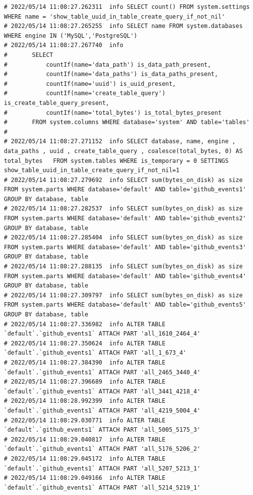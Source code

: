 \begin{verbatim}
# 2022/05/14 11:08:27.262311  info SELECT count() FROM system.settings WHERE name = 'show_table_uuid_in_table_create_query_if_not_nil'
# 2022/05/14 11:08:27.265255  info SELECT name FROM system.databases WHERE engine IN ('MySQL','PostgreSQL')
# 2022/05/14 11:08:27.267740  info
# 		SELECT
# 			countIf(name='data_path') is_data_path_present,
# 			countIf(name='data_paths') is_data_paths_present,
# 			countIf(name='uuid') is_uuid_present,
# 			countIf(name='create_table_query') is_create_table_query_present,
# 			countIf(name='total_bytes') is_total_bytes_present
# 		FROM system.columns WHERE database='system' AND table='tables'
#
# 2022/05/14 11:08:27.271152  info SELECT database, name, engine , data_paths , uuid , create_table_query , coalesce(total_bytes, 0) AS total_bytes   FROM system.tables WHERE is_temporary = 0 SETTINGS show_table_uuid_in_table_create_query_if_not_nil=1
# 2022/05/14 11:08:27.279692  info SELECT sum(bytes_on_disk) as size FROM system.parts WHERE database='default' AND table='github_events1' GROUP BY database, table
# 2022/05/14 11:08:27.282537  info SELECT sum(bytes_on_disk) as size FROM system.parts WHERE database='default' AND table='github_events2' GROUP BY database, table
# 2022/05/14 11:08:27.285404  info SELECT sum(bytes_on_disk) as size FROM system.parts WHERE database='default' AND table='github_events3' GROUP BY database, table
# 2022/05/14 11:08:27.288135  info SELECT sum(bytes_on_disk) as size FROM system.parts WHERE database='default' AND table='github_events4' GROUP BY database, table
# 2022/05/14 11:08:27.309797  info SELECT sum(bytes_on_disk) as size FROM system.parts WHERE database='default' AND table='github_events5' GROUP BY database, table
# 2022/05/14 11:08:27.336982  info ALTER TABLE `default`.`github_events1` ATTACH PART 'all_1610_2464_4'
# 2022/05/14 11:08:27.350624  info ALTER TABLE `default`.`github_events1` ATTACH PART 'all_1_673_4'
# 2022/05/14 11:08:27.384390  info ALTER TABLE `default`.`github_events1` ATTACH PART 'all_2465_3440_4'
# 2022/05/14 11:08:27.396689  info ALTER TABLE `default`.`github_events1` ATTACH PART 'all_3441_4218_4'
# 2022/05/14 11:08:28.992399  info ALTER TABLE `default`.`github_events1` ATTACH PART 'all_4219_5004_4'
# 2022/05/14 11:08:29.030771  info ALTER TABLE `default`.`github_events1` ATTACH PART 'all_5005_5175_3'
# 2022/05/14 11:08:29.040817  info ALTER TABLE `default`.`github_events1` ATTACH PART 'all_5176_5206_2'
# 2022/05/14 11:08:29.045172  info ALTER TABLE `default`.`github_events1` ATTACH PART 'all_5207_5213_1'
# 2022/05/14 11:08:29.049166  info ALTER TABLE `default`.`github_events1` ATTACH PART 'all_5214_5219_1'

\end{verbatim}
